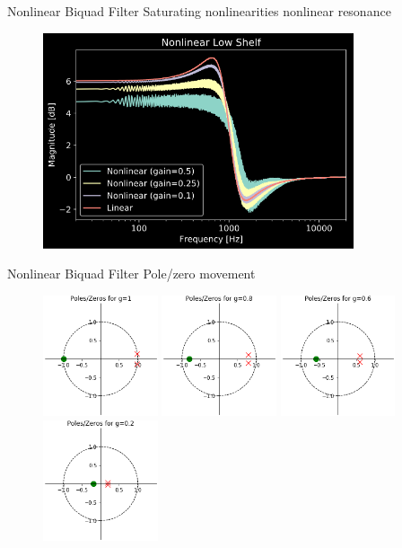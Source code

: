 \begin{frame}{Nonlinear Biquad Filter}
    Saturating nonlinearities \rightarrow nonlinear resonance
    \begin{figure}
        \includegraphics[height=2.5in]{../NonlinearBiquad/Pics/NL-LowShelf.png}
    \end{figure}
\end{frame}

\begin{frame}{Nonlinear Biquad Filter}
    Pole/zero movement
    \begin{figure}
        \includegraphics[width=1.33in]{../NonlinearBiquad/Pics/pz1.png}
        \includegraphics[width=1.33in]{../NonlinearBiquad/Pics/pz08.png}
        \includegraphics[width=1.33in]{../NonlinearBiquad/Pics/pz06.png}
        \includegraphics[width=1.33in]{../NonlinearBiquad/Pics/pz02.png}
    \end{figure}
\end{frame}


